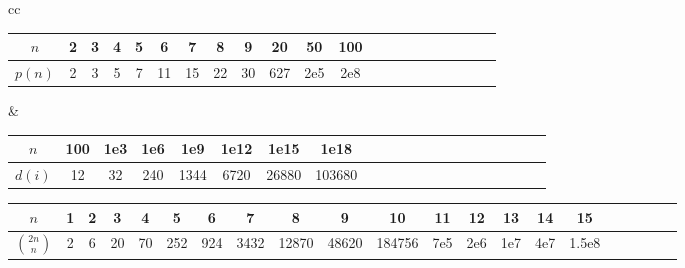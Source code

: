 {
  \setlength{\tabcolsep}{1pt}
  \setlength{\columnsep}{0pt}

  \noindent
  \begin{tabular}{cc}
    \begin{tabular}{@{}c|*{20}{c@{\ }}@{}}
      $n$    & 2 & 3 & 4 & 5 & 6  & 7  & 8  & 9  & 20  & 50  & 100 \\
      \hline
      $p(n)$ & 2 & 3 & 5 & 7 & 11 & 15 & 22 & 30 & 627 & 2e5 & 2e8 \\
    \end{tabular}
      &
      \begin{tabular}{@{}c|*{20}{c@{\ }}@{}}
        $n$
  & 100 & 1e3 & 1e6 & 1e9  & 1e12 & 1e15  & 1e18 \\
  \hline
  $d(i)$ %
  & 12  & 32  & 240 & 1344 & 6720 & 26880 & 103680 \\
      \end{tabular}
  \end{tabular}


  \begin{tabular}{c|*{20}c}
    $n$             & 1 & 2 & 3  & 4  & 5   & 6   & 7    & 8     & 9
                    & 10     & 11  & 12  & 13  & 14  & 15 \\
                    \hline
    $\binom{2n}{n}$ & 2 & 6 & 20 & 70 & 252 & 924 & 3432 & 12870 & 48620
                    & 184756 & 7e5 & 2e6 & 1e7 & 4e7 & 1.5e8 \\
  \end{tabular}
}
